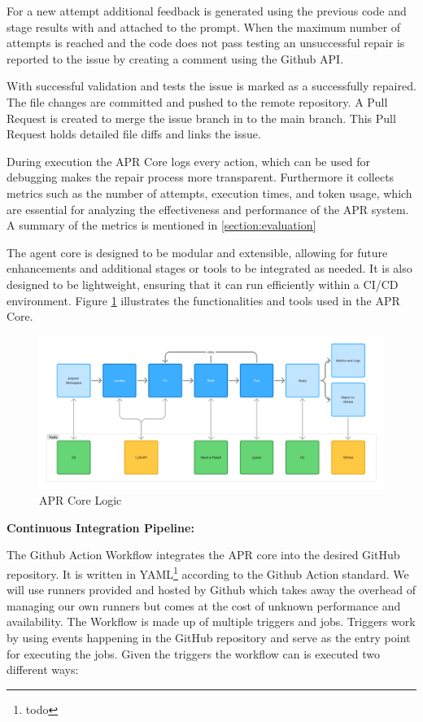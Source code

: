 For a new attempt additional feedback is generated using the previous code and stage results with and attached to the prompt. When the maximum number of attempts is reached and the code does not pass testing an unsuccessful repair is reported to the issue by creating a comment using the Github API.

With successful validation and tests the issue is marked as a successfully repaired. The file changes are committed and pushed to the remote repository. A Pull Request is created to merge the issue branch in to the main branch. This Pull Request holds detailed file diffs and links the issue.

During execution the APR Core logs every action, which can be used for debugging makes the repair process more transparent. Furthermore it collects metrics such as the number of attempts, execution times, and token usage, which are essential for analyzing the effectiveness and performance of the APR system. A summary of the metrics is mentioned in \ref{section:evaluation}

The agent core is designed to be modular and extensible, allowing for future enhancements and additional stages or tools to be integrated as needed. It is also designed to be lightweight, ensuring that it can run efficiently within a CI/CD environment. Figure \ref{fig:apr-core} illustrates the functionalities and tools used in the APR Core.

\begin{figure}[H]
    \centering
    \includegraphics[width=1\textwidth]{images/flowcharts/apr-core.png}
    \caption{APR Core Logic}
    \label{fig:apr-core}
\end{figure}

\textbf{Continuous Integration Pipeline:}

The Github Action Workflow integrates the APR core into the desired GitHub repository. It is written in YAML\footnote{todo} according to the Github Action standard. %
We will use runners provided and hosted by Github which takes away the overhead of managing our own runners but comes at the cost of unknown performance and availability. %
The Workflow is made up of multiple triggers and jobs. Triggers work by using events happening in the GitHub repository and serve as the entry point for executing the jobs. Given the triggers the workflow can is executed two different ways:

